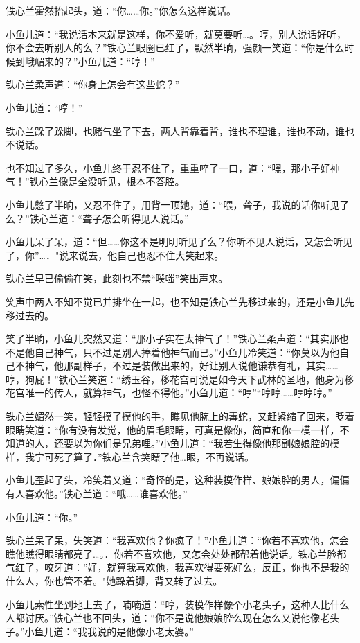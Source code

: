 \documentclass[12pt,oneside]{book}
\begin{document}
铁心兰霍然抬起头，道：``你\ldots\ldots 你。''你怎么这样说话。

小鱼儿道：``我说话本来就是这样，你不爱听，就莫要听\ldots。哼，别人说话好听，你不会去听别人的么？''铁心兰眼圈已红了，默然半晌，强颜一笑道：``你是什么时候到峨嵋来的？''小鱼儿道：``哼！''

铁心兰柔声道：``你身上怎会有这些蛇？''

小鱼儿道：``哼！''

铁心兰跺了跺脚，也赌气坐了下去，两人背靠着背，谁也不理谁，谁也不动，谁也不说话。

也不知过了多久，小鱼儿终于忍不住了，重重啐了一口，道：``嘿，那小子好神气！''铁心兰像是全没听见，根本不答腔。

小鱼儿憋了半晌，又忍不住了，用背一顶她，道：``喂，聋子，我说的话你听见了么？''铁心兰道：``聋子怎会听得见人说话。''

小鱼儿呆了呆，道：``但\ldots\ldots 你这不是明明听见了么？你听不见人说话，又怎会听见了，你''\ldots．"说来说去，他自己也忍不住大笑起来。

铁心兰早已偷偷在笑，此刻也不禁``噗嗤''笑出声来。

笑声中两人不知不觉已并排坐在一起，也不知是铁心兰先移过来的，还是小鱼儿先移过去的。

笑了半晌，小鱼儿突然又道：``那小子实在太神气了！''铁心兰柔声道：``其实那也不是他自己神气，只不过是别人捧着他神气而已。''小鱼儿冷笑道：``你莫以为他自己不神气，他那副样子，不过是装做出来的，好让别人说他谦恭有礼，其实\ldots\ldots 哼，狗屁！''铁心兰笑道：``绣玉谷，移花宫可说是如今天下武林的圣地，他身为移花宫唯一的传人，就算神气，也怪不得他。''小鱼儿道：``哼''``哼哼\ldots\ldots 哼哼哼。''

铁心兰媚然一笑，轻轻摸了摸他的手，瞧见他腕上的毒蛇，又赶紧缩了回来，眨着眼睛笑道：``你有没有发觉，他的眉毛眼睛，可真是像你，简直和你一模一样，不知道的人，还要以为你们是兄弟哩。''小鱼儿道：``我若生得像他那副娘娘腔的模样，我宁可死了算了．''铁心兰含笑瞟了他\ldots 眼，不再说话。

小鱼儿歪起了头，冷笑着又道：``奇怪的是，这种装摸作样、娘娘腔的男人，偏偏有人喜欢他。''铁心兰道：``哦\ldots\ldots 谁喜欢他。''

小鱼儿道：``你。''

铁心兰呆了呆，失笑道：``我喜欢他？你疯了！''小鱼儿道：``你若不喜欢他，怎会瞧他瞧得眼睛都亮了\ldots。．你若不喜欢他，又怎会处处都帮着他说话。铁心兰脸都气红了，咬牙道：''好，就算我喜欢他，我喜欢得要死好么，反正，你也不是我的什么人，你也管不着。"她跺着脚，背又转了过去。

小鱼儿索性坐到地上去了，喃喃道：``哼，装模作样像个小老头子，这种人比什么人都讨厌。''铁心兰也不回头，道：``你不是说他娘娘腔么现在怎么又说他像老头子。''小鱼儿道：``我我说的是他像小老太婆。''
\end{document}
